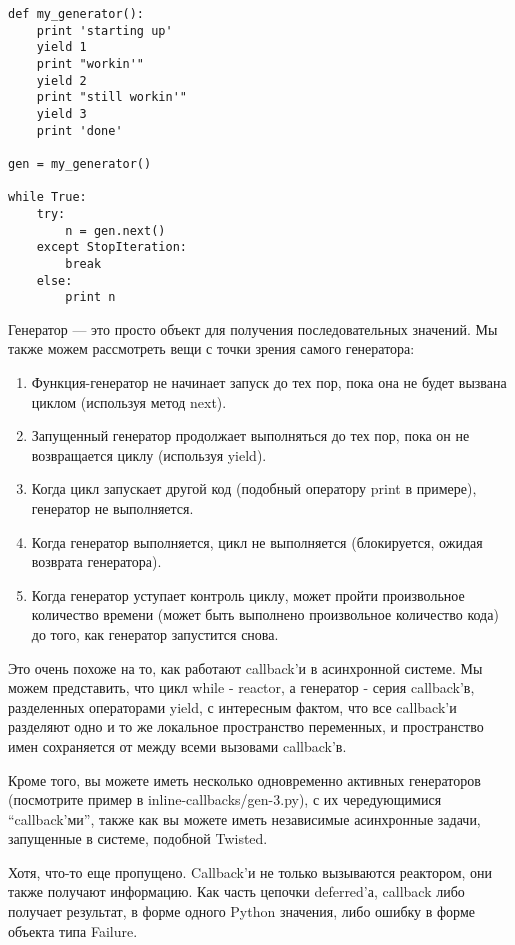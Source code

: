  \begin{verbatim}
def my_generator():
    print 'starting up'
    yield 1
    print "workin'"
    yield 2
    print "still workin'"
    yield 3
    print 'done'

gen = my_generator()

while True:
    try:
        n = gen.next()
    except StopIteration:
        break
    else:
        print n
\end{verbatim} 


Генератор --- это просто объект для получения последовательных значений. 
Мы также можем рассмотреть вещи с точки зрения самого генератора:

\begin{enumerate}
\item Функция-генератор не начинает запуск до тех пор, пока она не 
будет вызвана циклом (используя метод next).
\item Запущенный генератор продолжает выполняться до тех пор, пока 
он не возвращается циклу (используя yield). 
\item Когда цикл запускает другой код (подобный оператору print в примере), 
генератор не выполняется.
\item Когда генератор выполняется, цикл не выполняется (блокируется, ожидая возврата генератора).
\item Когда генератор уступает контроль циклу, может пройти произвольное 
количество времени (может быть выполнено произвольное количество кода) до того, 
как генератор запустится снова.
\end{enumerate}


Это очень похоже на то, как работают callback'и в асинхронной системе. 
Мы можем представить, что цикл while - reactor, а 
генератор - серия callback'в, разделенных операторами yield, 
с интересным фактом, что все callback'и разделяют одно и то же 
локальное пространство переменных, и пространство имен сохраняется 
от между всеми вызовами callback'в.


Кроме того, вы можете иметь несколько одновременно активных генераторов 
(посмотрите пример в inline-callbacks/gen-3.py), 
с их чередующимися ``callback'ми'', 
также как вы можете иметь независимые асинхронные задачи, 
запущенные в системе, подобной Twisted.


Хотя, что-то еще пропущено. Callback'и не только вызываются реактором, 
они также получают информацию. Как часть цепочки deferred'а, callback 
либо получает результат, в форме одного Python значения, либо ошибку в 
форме объекта типа Failure. 


